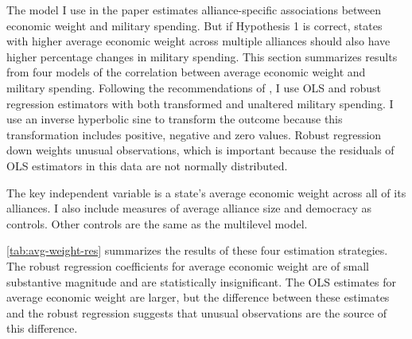 \documentclass[12pt]{article}
\begin{document}
The model I use in the paper estimates alliance-specific associations between economic weight and military spending. 
But if Hypothesis 1 is correct, states with higher average economic weight across multiple alliances should also have higher percentage changes in military spending. 
This section summarizes results from four models of the correlation between average economic weight and military spending. 
Following the recommendations of \citep{RaineyBaissa2018}, I use OLS and robust regression estimators with both transformed and unaltered military spending.  
I use an inverse hyperbolic sine to transform the outcome because this transformation includes positive, negative and zero values. 
Robust regression down weights unusual observations, which is important because the residuals of OLS estimators in this data are not normally distributed. 


The key independent variable is a state's average economic weight across all of its alliances. 
I also include measures of average alliance size and democracy \citep{DigiuseppePoast2016} as controls. 
Other controls are the same as the multilevel model.  


\autoref{tab:avg-weight-res} summarizes the results of these four estimation strategies. 
The robust regression coefficients for average economic weight are of small substantive magnitude and are statistically insignificant. 
The OLS estimates for average economic weight are larger, but the difference between these estimates and the robust regression suggests that unusual observations are the source of this difference. 
\end{document}
